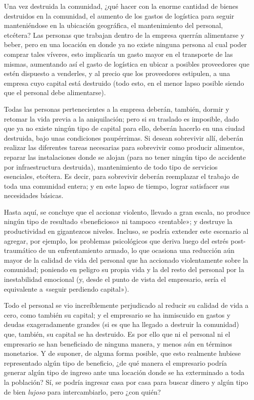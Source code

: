 \documentclass[12pt,a4paper,twoside]{book}
\begin{document}
Una vez destruida la comunidad, ¿qué hacer con la enorme cantidad de bienes destruidos en la comunidad, el aumento de los gastos de logística para seguir manteniéndose en la ubicación geográfica, el mantenimiento del personal, etcétera? Las personas que trabajan dentro de la empresa querrán alimentarse y beber, pero en una locación en donde ya no existe ninguna persona al cual poder comprar tales víveres, esto implicaría un gasto mayor en el transporte de las mismas, aumentando así el gasto de logística en ubicar a posibles proveedores que estén dispuesto a venderles, y al precio que los proveedores estipulen, a una empresa cuyo capital está destruido (todo esto, en el menor lapso posible siendo que el personal debe alimentarse).

Todas las personas pertenecientes a la empresa deberán, también, dormir y retomar la vida previa a la aniquilación; pero si su traslado es imposible, dado que ya no existe ningún tipo de capital para ello, deberán hacerlo en una ciudad destruida, bajo unas condiciones paupérrimas. Si desean sobrevivir allí, deberán realizar las diferentes tareas necesarias para sobrevivir como producir alimentos, reparar las instalaciones donde se alojan (para no tener ningún tipo de accidente por infraestructura destruida), mantenimiento de todo tipo de servicios esenciales, etcétera. Es decir, para sobrevivir deberán reemplazar el trabajo de toda una comunidad entera; y en este lapso de tiempo, lograr satisfacer sus necesidades básicas.

Hasta aquí, se concluye que el accionar violento, llevado a gran escala, no produce ningún tipo de resultado «beneficioso» ni tampoco «rentable»; y destruye la productividad en gigantezcos niveles. Incluso, se podría extender este escenario al agregar, por ejemplo, los problemas psicológicos que deriva luego del estrés post-traumático de un enfrentamiento armado, lo que ocasiona una reducción aún mayor de la calidad de vida del personal que ha accionado violentamente sobre la comunidad; poniendo en peligro su propia vida y la del resto del personal por la inestabilidad emocional (y, desde el punto de vista del empresario, sería el equivalente a «seguir perdiendo capital»).

Todo el personal se vio increíblemente perjudicado al reducir su calidad de vida a cero, como también su capital; y el empresario se ha inmiscuido en gastos y deudas exageradamente grandes (si es que ha llegado a destruir la comunidad) que, también, su capital se ha destruido. Es por ello que ni el personal ni el empresario se han beneficiado de ninguna manera, y menos aún en términos monetarios. Y de suponer, de alguna forma posible, que esto realmente hubiese representado algún tipo de beneficio, ¿de qué manera el empresario podría generar algún tipo de ingreso ante una locación donde se ha exterminado a toda la población? Sí, se podría ingresar casa por casa para buscar dinero y algún tipo de bien \textit{lujoso} para intercambiarlo, pero ¿con quién?
\end{document}
